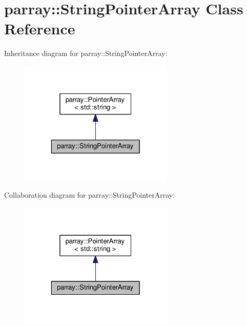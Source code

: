\hypertarget{classparray_1_1StringPointerArray}{\section{parray\-:\-:String\-Pointer\-Array Class Reference}
\label{classparray_1_1StringPointerArray}
}


Inheritance diagram for parray\-:\-:String\-Pointer\-Array\-:\nopagebreak
\begin{figure}[H]
\begin{center}
\leavevmode
\includegraphics[width=208pt]{classparray_1_1StringPointerArray__inherit__graph}
\end{center}
\end{figure}


Collaboration diagram for parray\-:\-:String\-Pointer\-Array\-:\nopagebreak
\begin{figure}[H]
\begin{center}
\leavevmode
\includegraphics[width=208pt]{classparray_1_1StringPointerArray__coll__graph}
\end{center}
\end{figure}

